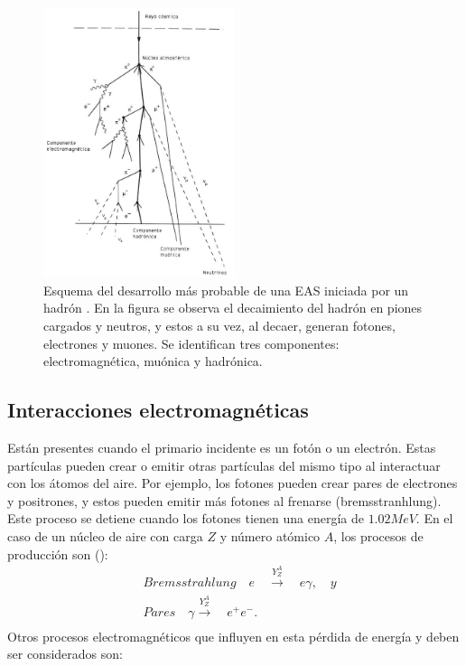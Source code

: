 \begin{figure}[htb!]
\centering
    \begin{center}
        \includegraphics[width=0.5\textwidth]{Figs/componentes_cas.jpg}
    \end{center}{}
    \caption[Esquema del desarrollo de una EAS iniciada por un hadrón.]{Esquema del desarrollo más probable de una EAS iniciada por un hadrón \cite{mauro:tesis}. En la figura se observa el decaimiento del hadrón en piones cargados y neutros, y estos a su vez, al decaer, generan fotones, electrones y muones. Se identifican tres componentes: electromagnética, muónica y hadrónica.}
    \label{fig:fig3}
\end{figure}

\subsection{Interacciones electromagnéticas}
Están presentes cuando el primario incidente es un fotón o un electrón. Estas partículas pueden crear o emitir otras partículas del mismo tipo al interactuar con los átomos del aire. Por ejemplo, los fotones pueden crear pares de electrones y positrones, y estos pueden emitir más fotones al frenarse (bremsstranhlung). Este proceso se detiene cuando los fotones tienen una energía de $1.02 MeV$. En el caso de un núcleo de aire con carga $Z$ y número atómico $A$, los procesos de producción son (\cite{heitler}):
\begin{equation}
\begin{split}
&Bremsstrahlung\quad e \quad \xrightarrow{Y^{A}_{Z}} \quad e\gamma ,  \quad y \\
&Pares \quad \gamma \xrightarrow{Y^{A}_{Z}} \quad e^{+}e^{-}. \\
\end{split}
\end{equation} 
Otros procesos electromagnéticos que influyen en esta pérdida de energía y deben ser considerados son:

